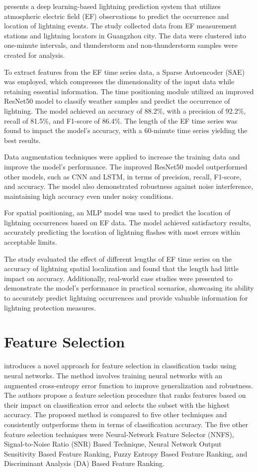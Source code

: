 \textcite{new3} presents a deep learning-based lightning prediction system that utilizes atmospheric electric field (EF) observations to predict the occurrence and location of lightning events. The study collected data from EF measurement stations and lightning locators in Guangzhou city. The data were clustered into one-minute intervals, and thunderstorm and non-thunderstorm samples were created for analysis.

To extract features from the EF time series data, a Sparse Autoencoder (SAE) was employed, which compresses the dimensionality of the input data while retaining essential information. The time positioning module utilized an improved ResNet50 model to classify weather samples and predict the occurrence of lightning. The model achieved an accuracy of 88.2\%, with a precision of 92.2\%, recall of 81.5\%, and F1-score of 86.4\%. The length of the EF time series was found to impact the model's accuracy, with a 60-minute time series yielding the best results.

Data augmentation techniques were applied to increase the training data and improve the model's performance. The improved ResNet50 model outperformed other models, such as CNN and LSTM, in terms of precision, recall, F1-score, and accuracy. The model also demonstrated robustness against noise interference, maintaining high accuracy even under noisy conditions.

For spatial positioning, an MLP model was used to predict the location of lightning occurrences based on EF data. The model achieved satisfactory results, accurately predicting the location of lightning flashes with most errors within acceptable limits.

The study evaluated the effect of different lengths of EF time series on the accuracy of lightning spatial localization and found that the length had little impact on accuracy. Additionally, real-world case studies were presented to demonstrate the model's performance in practical scenarios, showcasing its ability to accurately predict lightning occurrences and provide valuable information for lightning protection measures.

\section{Feature Selection}

\textcite{new4} introduces a novel approach for feature selection in classification tasks using neural networks. The method involves training neural networks with an augmented cross-entropy error function to improve generalization and robustness. The authors propose a feature selection procedure that ranks features based on their impact on classification error and selects the subset with the highest accuracy. The proposed method is compared to five other techniques and consistently outperforms them in terms of classification accuracy. The five other feature selection techniques were Neural-Network Feature Selector (NNFS), Signal-to-Noise Ratio (SNR) Based Technique, Neural Network Output Sensitivity Based Feature Ranking, Fuzzy Entropy Based Feature Ranking, and Discriminant Analysis (DA) Based Feature Ranking. 

